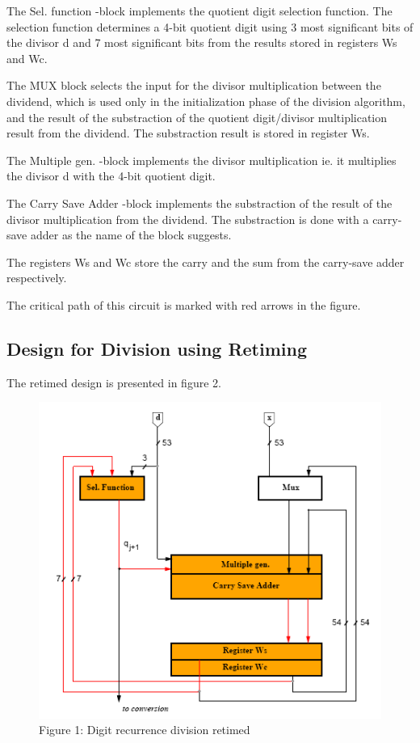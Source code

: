 \documentclass[11pt,a4paper]{article}
\begin{document}
The Sel. function -block implements the quotient digit selection function. The selection function determines a 4-bit quotient digit using 3 most significant bits of the divisor d and 7 most significant bits from the results stored in registers Ws and Wc.

The MUX block selects the input for the divisor multiplication between the dividend, which is used only in the initialization phase of the division algorithm, and the result of the substraction of the quotient digit/divisor multiplication result from the dividend. The substraction result is stored in register Ws.

The Multiple gen. -block implements the divisor multiplication ie. it multiplies the divisor d with the 4-bit quotient digit.

The Carry Save Adder -block implements the substraction of the result of the divisor multiplication from the dividend. The substraction is done with a carry-save adder as the name of the block suggests.

The registers Ws and Wc store the carry and the sum from the carry-save adder respectively.

The critical path of this circuit is marked with red arrows in the figure.

\subsection{Design for Division using Retiming}
The retimed design is presented in figure 2.

\begin{figure}
	\centering
		\includegraphics{./noretiming.PNG}
	\caption{Figure 1: Digit recurrence division retimed}
	\label{fig:retiming}
\end{figure}
\end{document}
